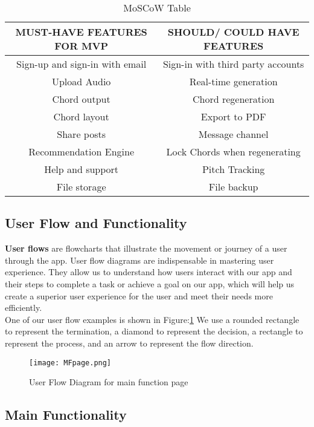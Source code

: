 \begin{table}[ht]
\centering
\begin{tabular}{ |c|c| } 
 \hline
\textbf{MUST-HAVE FEATURES FOR MVP} & \textbf{SHOULD/ COULD HAVE FEATURES}\\ 
 \hline
 Sign-up and sign-in with email & Sign-in with third party accounts \\ 
 \hline
 Upload Audio & Real-time generation \\ 
 \hline
 Chord output & Chord regeneration \\ 
 \hline
 Chord layout &  Export to PDF \\ 
 \hline
 Share posts & Message channel \\ 
 \hline
 Recommendation Engine &  Lock Chords when regenerating\\ 
 \hline
 Help and support &  Pitch Tracking\\ 
 \hline
 File storage& File backup \\ 
 \hline
 \end{tabular}
 \caption{MoSCoW Table}
 \centering
 \label{moscow}
 \end{table}
 
 \subsection{User Flow and Functionality}
 \textbf{User flows} are flowcharts that illustrate the movement or journey of a user through the app. User flow diagrams are indispensable in mastering user experience. 
 They allow us to understand how users interact with our app and their steps to complete a task or achieve a goal on our app, 
 which will help us create a superior user experience for the user and meet their needs more efficiently. 
 \\One of our user flow examples is shown in Figure:\ref{flowchartmain}
 We use a rounded rectangle to represent the termination, a diamond to represent the decision, a rectangle to represent the process, and an arrow to represent the flow direction.

\begin{figure}[ht]
\centering
\texttt{[image: MFpage.png]}
\caption{User Flow Diagram for main function page}
\label{flowchartmain}
\end{figure}


\subsection*{Main Functionality}

